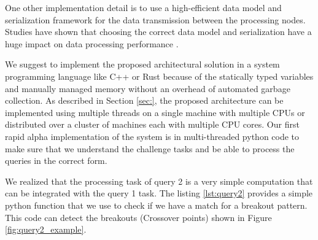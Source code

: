 One other implementation detail is to use a high-efficient data model and serialization framework for the data transmission between 
the processing nodes. Studies have shown that choosing the correct data model and serialization have a huge impact on data 
processing performance \cite{DBLP:conf/cloud/SikdarTJ17}. 

We suggest to implement the proposed architectural solution in a system programming language like C++ or Rust because of the statically typed variables and manually managed memory without an overhead of automated garbage collection. As described in Section \ref{sec:}, the proposed architecture can be implemented using multiple threads on a single machine with multiple CPUs or distributed over a cluster of machines each with multiple CPU cores. Our first rapid alpha implementation of the system is in multi-threaded python code to make sure that we understand the challenge tasks and be able to process the queries in the correct form.  

We realized that the processing task of query 2 is a very simple computation that can be integrated with the query 1 task. 
The listing \ref{lst:query2} provides a simple python function that we use to check if we have a match for a breakout pattern. 
This code can detect the breakouts (Crossover points) shown in Figure \ref{fig:query2_example}.



